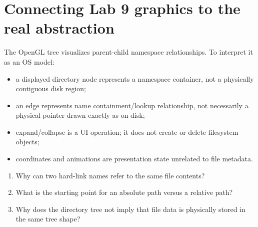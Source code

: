 \section{Connecting Lab 9 graphics to the real abstraction}
The OpenGL tree visualizes parent-child namespace relationships. To interpret it as an OS model:
\begin{itemize}
  \item a displayed directory node represents a namespace container, not a physically contiguous disk region;
  \item an edge represents name containment/lookup relationship, not necessarily a physical pointer drawn exactly as on disk;
  \item expand/collapse is a UI operation; it does not create or delete filesystem objects;
  \item coordinates and animations are presentation state unrelated to file metadata.
\end{itemize}

\begin{quickcheck}
\begin{enumerate}
  \item Why can two hard-link names refer to the same file contents?
  \item What is the starting point for an absolute path versus a relative path?
  \item Why does the directory tree not imply that file data is physically stored in the same tree shape?
\end{enumerate}
\end{quickcheck}
